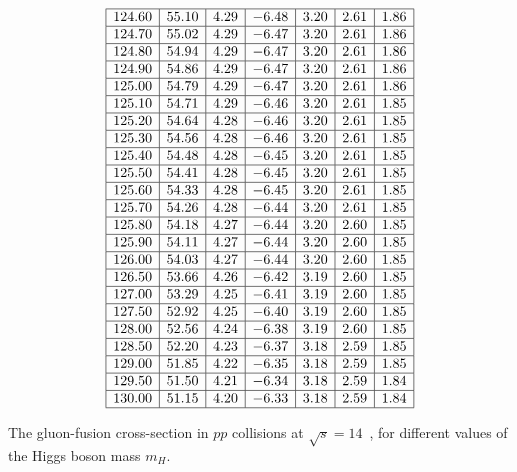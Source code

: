 \begin{table}[!h]
\begin{center}
\begin{equation}
\begin{array}{|c|c|c|c|c|c|c|}
\hline 
124.60 & 55.10 & 4.29 & -6.48 & 3.20 & 2.61 & 1.86\\
\hline 
124.70 & 55.02 & 4.29 & -6.47 & 3.20 & 2.61 & 1.86\\
\hline 
124.80 & 54.94 & 4.29 & -6.47 & 3.20 & 2.61 & 1.86\\
\hline 
124.90 & 54.86 & 4.29 & -6.47 & 3.20 & 2.61 & 1.86\\
\hline 
125.00 & 54.79 & 4.29 & -6.47 & 3.20 & 2.61 & 1.86\\
\hline 
125.10 & 54.71 & 4.29 & -6.46 & 3.20 & 2.61 & 1.85\\
\hline 
125.20 & 54.64 & 4.28 & -6.46 & 3.20 & 2.61 & 1.85\\
\hline 
125.30 & 54.56 & 4.28 & -6.46 & 3.20 & 2.61 & 1.85\\
\hline 
125.40 & 54.48 & 4.28 & -6.45 & 3.20 & 2.61 & 1.85\\
\hline 
125.50 & 54.41 & 4.28 & -6.45 & 3.20 & 2.61 & 1.85\\
\hline 
125.60 & 54.33 & 4.28 & -6.45 & 3.20 & 2.61 & 1.85\\
\hline 
125.70 & 54.26 & 4.28 & -6.44 & 3.20 & 2.61 & 1.85\\
\hline 
125.80 & 54.18 & 4.27 & -6.44 & 3.20 & 2.60 & 1.85\\
\hline 
125.90 & 54.11 & 4.27 & -6.44 & 3.20 & 2.60 & 1.85\\
\hline 
126.00 & 54.03 & 4.27 & -6.44 & 3.20 & 2.60 & 1.85\\
\hline 
126.50 & 53.66 & 4.26 & -6.42 & 3.19 & 2.60 & 1.85\\
\hline 
127.00 & 53.29 & 4.25 & -6.41 & 3.19 & 2.60 & 1.85\\
\hline 
127.50 & 52.92 & 4.25 & -6.40 & 3.19 & 2.60 & 1.85\\
\hline 
128.00 & 52.56 & 4.24 & -6.38 & 3.19 & 2.60 & 1.85\\
\hline 
128.50 & 52.20 & 4.23 & -6.37 & 3.18 & 2.59 & 1.85\\
\hline 
129.00 & 51.85 & 4.22 & -6.35 & 3.18 & 2.59 & 1.85\\
\hline 
129.50 & 51.50 & 4.21 & -6.34 & 3.18 & 2.59 & 1.84\\
\hline 
130.00 & 51.15 & 4.20 & -6.33 & 3.18 & 2.59 & 1.84\\
\hline
\end{array}
\nonumber
\end{equation}
\end{center}
\caption{The gluon-fusion cross-section in $pp$ collisions at $\sqrt{s}=14$~\UTeV, for different values of the Higgs boson mass $m_H$. \label{ggF:14TeV}}
\end{table}


